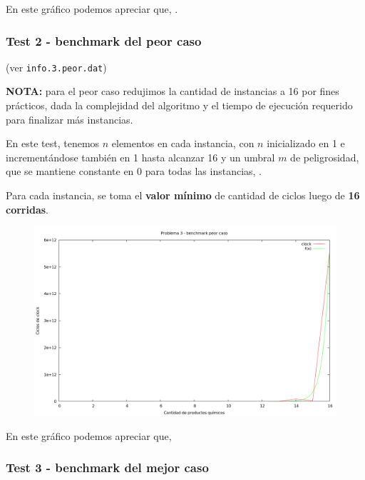 En este gráfico podemos apreciar que, .


\newpage
\subsubsection{Test 2 - benchmark del peor caso}

(ver \verb|info.3.peor.dat|) \medskip

\textbf{NOTA:} para el peor caso redujimos la cantidad de instancias a 16 por fines prácticos, dada la complejidad 
del algoritmo y el tiempo de ejecución requerido para finalizar más instancias. \medskip

En este test, tenemos $n$ elementos en cada instancia, con $n$ inicializado en 1 e incrementándose 
también en 1 hasta alcanzar 16 y un umbral $m$ de peligrosidad, que se mantiene constante en 0 para todas las 
instancias, .
 
Para cada instancia, se toma el \textbf{valor mínimo} de cantidad de ciclos luego de \textbf{16 corridas}.

\vspace*{0.5cm}

\begin{figure}[h]
  \begin{center}
    \includegraphics[scale=0.35]{imagenes/grafico-3-peor.png}
  \end{center}
\end{figure}

\vspace*{0.5cm}

En este gráfico podemos apreciar que, 


\newpage
\subsubsection{Test 3 - benchmark del mejor caso}

